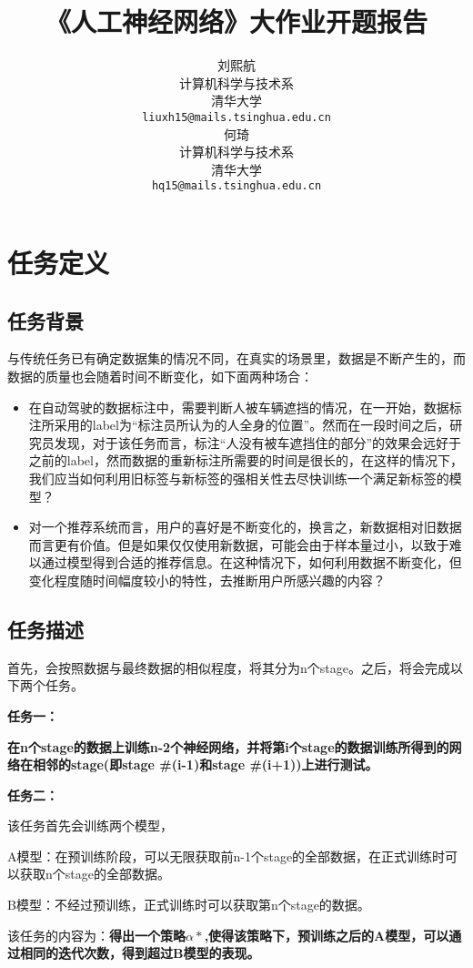 \documentclass{article}
\title{《人工神经网络》大作业开题报告}
\author{
  刘熙航 \\
  计算机科学与技术系 \\
  清华大学 \\
  \texttt{liuxh15@mails.tsinghua.edu.cn} \\
  \AND
  何琦\\
  计算机科学与技术系 \\
  清华大学 \\
  \texttt{hq15@mails.tsinghua.edu.cn} \\
}
\begin{document}
\maketitle



\section{任务定义}
\subsection{任务背景}

与传统任务已有确定数据集的情况不同，在真实的场景里，数据是不断产生的，而数据的质量也会随着时间不断变化，如下面两种场合：

\begin{itemize}
    \item 在自动驾驶的数据标注中，需要判断人被车辆遮挡的情况，在一开始，数据标注所采用的label为“标注员所认为的人全身的位置”。然而在一段时间之后，研究员发现，对于该任务而言，标注“人没有被车遮挡住的部分”的效果会远好于之前的label，然而数据的重新标注所需要的时间是很长的，在这样的情况下，我们应当如何利用旧标签与新标签的强相关性去尽快训练一个满足新标签的模型？
    \item 对一个推荐系统而言，用户的喜好是不断变化的，换言之，新数据相对旧数据而言更有价值。但是如果仅仅使用新数据，可能会由于样本量过小，以致于难以通过模型得到合适的推荐信息。在这种情况下，如何利用数据不断变化，但变化程度随时间幅度较小的特性，去推断用户所感兴趣的内容？
\end{itemize}

\subsection{任务描述}
首先，会按照数据与最终数据的相似程度，将其分为n个stage。之后，将会完成以下两个任务。

\textbf{任务一：}

\textbf{在n个stage的数据上训练n-2个神经网络，并将第i个stage的数据训练所得到的网络在相邻的stage(即stage \#(i-1)和stage \#(i+1))上进行测试。}

\textbf{任务二：}

该任务首先会训练两个模型，

A模型：在预训练阶段，可以无限获取前n-1个stage的全部数据，在正式训练时可以获取n个stage的全部数据。

B模型：不经过预训练，正式训练时可以获取第n个stage的数据。

该任务的内容为：\textbf{得出一个策略$\alpha*$,使得该策略下，预训练之后的A模型，可以通过相同的迭代次数，得到超过B模型的表现。}
\end{document}
